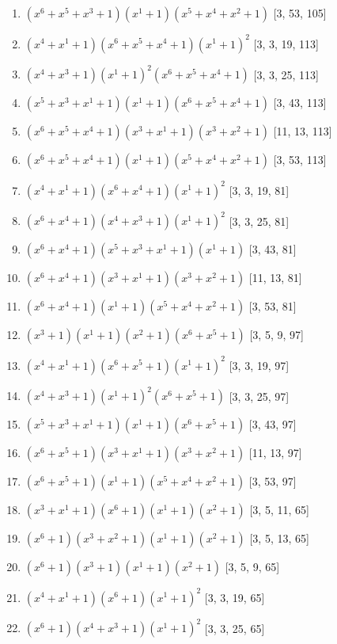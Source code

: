 \documentclass[10pt,twocolumn]{article}
\begin{document}
\begin{enumerate}
\item $(x^{6} + x^{5} + x^{3} + 1)(x^{1} + 1)(x^{5} + x^{4} + x^{2} + 1)$  [3, 53, 105]
\item $(x^{4} + x^{1} + 1)(x^{6} + x^{5} + x^{4} + 1)(x^{1} + 1)^{2}$  [3, 3, 19, 113]
\item $(x^{4} + x^{3} + 1)(x^{1} + 1)^{2}(x^{6} + x^{5} + x^{4} + 1)$  [3, 3, 25, 113]
\item $(x^{5} + x^{3} + x^{1} + 1)(x^{1} + 1)(x^{6} + x^{5} + x^{4} + 1)$  [3, 43, 113]
\item $(x^{6} + x^{5} + x^{4} + 1)(x^{3} + x^{1} + 1)(x^{3} + x^{2} + 1)$  [11, 13, 113]
\item $(x^{6} + x^{5} + x^{4} + 1)(x^{1} + 1)(x^{5} + x^{4} + x^{2} + 1)$  [3, 53, 113]
\item $(x^{4} + x^{1} + 1)(x^{6} + x^{4} + 1)(x^{1} + 1)^{2}$  [3, 3, 19, 81]
\item $(x^{6} + x^{4} + 1)(x^{4} + x^{3} + 1)(x^{1} + 1)^{2}$  [3, 3, 25, 81]
\item $(x^{6} + x^{4} + 1)(x^{5} + x^{3} + x^{1} + 1)(x^{1} + 1)$  [3, 43, 81]
\item $(x^{6} + x^{4} + 1)(x^{3} + x^{1} + 1)(x^{3} + x^{2} + 1)$  [11, 13, 81]
\item $(x^{6} + x^{4} + 1)(x^{1} + 1)(x^{5} + x^{4} + x^{2} + 1)$  [3, 53, 81]
\item $(x^{3} + 1)(x^{1} + 1)(x^{2} + 1)(x^{6} + x^{5} + 1)$  [3, 5, 9, 97]
\item $(x^{4} + x^{1} + 1)(x^{6} + x^{5} + 1)(x^{1} + 1)^{2}$  [3, 3, 19, 97]
\item $(x^{4} + x^{3} + 1)(x^{1} + 1)^{2}(x^{6} + x^{5} + 1)$  [3, 3, 25, 97]
\item $(x^{5} + x^{3} + x^{1} + 1)(x^{1} + 1)(x^{6} + x^{5} + 1)$  [3, 43, 97]
\item $(x^{6} + x^{5} + 1)(x^{3} + x^{1} + 1)(x^{3} + x^{2} + 1)$  [11, 13, 97]
\item $(x^{6} + x^{5} + 1)(x^{1} + 1)(x^{5} + x^{4} + x^{2} + 1)$  [3, 53, 97]
\item $(x^{3} + x^{1} + 1)(x^{6} + 1)(x^{1} + 1)(x^{2} + 1)$  [3, 5, 11, 65]
\item $(x^{6} + 1)(x^{3} + x^{2} + 1)(x^{1} + 1)(x^{2} + 1)$  [3, 5, 13, 65]
\item $(x^{6} + 1)(x^{3} + 1)(x^{1} + 1)(x^{2} + 1)$  [3, 5, 9, 65]
\item $(x^{4} + x^{1} + 1)(x^{6} + 1)(x^{1} + 1)^{2}$  [3, 3, 19, 65]
\item $(x^{6} + 1)(x^{4} + x^{3} + 1)(x^{1} + 1)^{2}$  [3, 3, 25, 65]

\end{enumerate}
\end{document}
